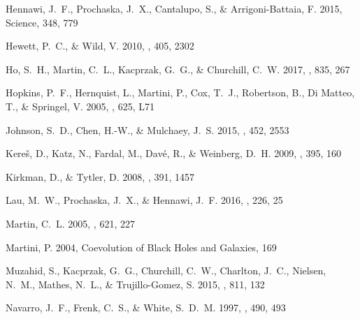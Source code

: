 \documentclass[iop]{emulateapj}
\begin{document}
\begin{thebibliography}{45}
{Hennawi}, J.~F., {Prochaska}, J.~X., {Cantalupo}, S., \& {Arrigoni-Battaia},
  F. 2015, Science, 348, 779

{Hewett}, P.~C., \& {Wild}, V. 2010, \mnras, 405, 2302

{Ho}, S.~H., {Martin}, C.~L., {Kacprzak}, G.~G., \& {Churchill}, C.~W. 2017,
  \apj, 835, 267

{Hopkins}, P.~F., {Hernquist}, L., {Martini}, P., {Cox}, T.~J., {Robertson},
  B., {Di Matteo}, T., \& {Springel}, V. 2005, \apjl, 625, L71

{Johnson}, S.~D., {Chen}, H.-W., \& {Mulchaey}, J.~S. 2015, \mnras, 452, 2553

{Kere\v{s}}, D., {Katz}, N., {Fardal}, M., {Dav{\'e}}, R., \& {Weinberg}, D.~H.
  2009, \mnras, 395, 160

{Kirkman}, D., \& {Tytler}, D. 2008, \mnras, 391, 1457

{Lau}, M.~W., {Prochaska}, J.~X., \& {Hennawi}, J.~F. 2016, \apjs, 226, 25

{Martin}, C.~L. 2005, \apj, 621, 227

{Martini}, P. 2004, Coevolution of Black Holes and Galaxies, 169

{Muzahid}, S., {Kacprzak}, G.~G., {Churchill}, C.~W., {Charlton}, J.~C.,
  {Nielsen}, N.~M., {Mathes}, N.~L., \& {Trujillo-Gomez}, S. 2015, \apj, 811,
  132

{Navarro}, J.~F., {Frenk}, C.~S., \& {White}, S.~D.~M. 1997, \apj, 490, 493


\end{thebibliography}
\end{document}
